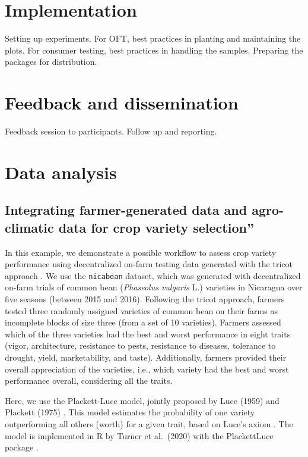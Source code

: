 \documentclass[
]{book}
\begin{document}
\chapter{Implementation}\label{implementation}

Setting up experiments. For OFT, best practices in planting and maintaining the plots. For consumer testing, best practices in handling the samples. Preparing the packages for distribution.

\chapter{Feedback and dissemination}\label{feedback-and-dissemination}

Feedback session to participants. Follow up and reporting.

\chapter{Data analysis}\label{data-analysis}

\section{Integrating farmer-generated data and agro-climatic data for crop variety selection''}\label{integrating-farmer-generated-data-and-agro-climatic-data-for-crop-variety-selection}

In this example, we demonstrate a possible workflow to assess crop variety performance using decentralized on-farm testing data generated with the tricot approach \citep{deSousa2024}. We use the \texttt{nicabean} dataset, which was generated with decentralized on-farm trials of common bean (\emph{Phaseolus vulgaris} L.) varieties in Nicaragua over five seasons (between 2015 and 2016). Following the tricot approach, farmers tested three randomly assigned varieties of common bean on their farms as incomplete blocks of size three (from a set of 10 varieties). Farmers assessed which of the three varieties had the best and worst performance in eight traits (vigor, architecture, resistance to pests, resistance to diseases, tolerance to drought, yield, marketability, and taste). Additionally, farmers provided their overall appreciation of the varieties, i.e., which variety had the best and worst performance overall, considering all the traits.

Here, we use the Plackett-Luce model, jointly proposed by Luce (1959) \citep{luce_individual_1959} and Plackett (1975) \citep{Plackett}. This model estimates the probability of one variety outperforming all others (worth) for a given trait, based on Luce's axiom \citep{luce_individual_1959}. The model is implemented in R by Turner et al.~(2020) with the PlackettLuce package \citep{Turner2020}.
\end{document}
